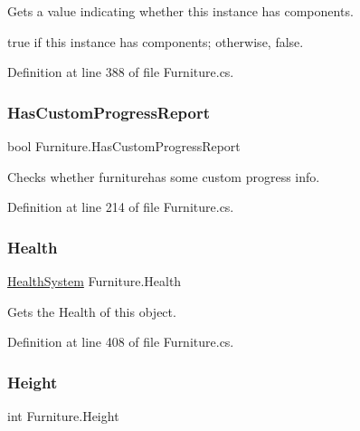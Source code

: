 Gets a value indicating whether this instance has components. 

{\ttfamily true} if this instance has components; otherwise, {\ttfamily false}.

Definition at line 388 of file Furniture.\+cs.

\mbox{\label{class_furniture_abf3299bf6129c3fff38397c232dba291}} 
\subsubsection{\texorpdfstring{Has\+Custom\+Progress\+Report}{HasCustomProgressReport}}
{\footnotesize\ttfamily bool Furniture.\+Has\+Custom\+Progress\+Report\hspace{0.3cm}{\ttfamily [get]}}



Checks whether furniturehas some custom progress info. 



Definition at line 214 of file Furniture.\+cs.

\mbox{\label{class_furniture_aa3ed4de73a436f888ac9689a8f2fab0d}} 
\subsubsection{\texorpdfstring{Health}{Health}}
{\footnotesize\ttfamily \hyperlink{class_health_system}{Health\+System} Furniture.\+Health\hspace{0.3cm}{\ttfamily [get]}}



Gets the Health of this object. 



Definition at line 408 of file Furniture.\+cs.

\mbox{\label{class_furniture_a1d0f0137f064f6231b3eeca83dc1e843}} 
\subsubsection{\texorpdfstring{Height}{Height}}
{\footnotesize\ttfamily int Furniture.\+Height\hspace{0.3cm}{\ttfamily [get]}}



